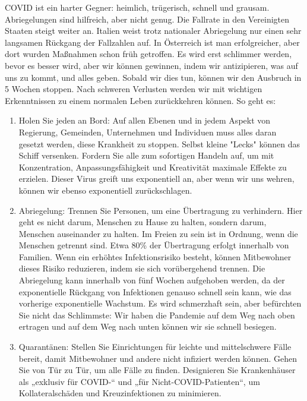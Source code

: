 \documentclass[onecolumn,journal]{IEEEtran}
\begin{document}
\begin{multicols}{2}
COVID ist ein harter Gegner: heimlich, trügerisch, schnell und grausam. Abriegelungen sind hilfreich, aber nicht genug. Die Fallrate in den Vereinigten Staaten steigt weiter an. Italien weist trotz nationaler Abriegelung nur einen sehr langsamen Rückgang der Fallzahlen auf. In Österreich ist man erfolgreicher, aber dort wurden Maßnahmen schon früh getroffen. Es wird erst schlimmer werden, bevor es besser wird, aber wir können gewinnen, indem wir antizipieren, was auf uns zu kommt, und alles geben. Sobald wir dies tun, können wir den Ausbruch in 5 Wochen stoppen. Nach schweren Verlusten werden wir mit wichtigen Erkenntnissen zu einem normalen Leben zurückkehren können. So geht es:

\begin{enumerate}
\item Holen Sie jeden an Bord: Auf allen Ebenen und in jedem Aspekt von Regierung, Gemeinden, Unternehmen und Individuen muss alles daran gesetzt werden, diese Krankheit zu stoppen. Selbst kleine "Lecks" können das Schiff versenken. Fordern Sie alle zum sofortigen Handeln auf, um mit Konzentration, Anpassungsfähigkeit und Kreativität maximale Effekte zu erzielen. Dieser Virus greift uns exponentiell an, aber wenn wir uns wehren, können wir ebenso exponentiell zurückschlagen.
\item Abriegelung: Trennen Sie Personen, um eine Übertragung zu verhindern. Hier geht es nicht darum, Menschen zu Hause zu halten, sondern darum, Menschen auseinander zu halten. Im Freien zu sein ist in Ordnung, wenn die Menschen getrennt sind. Etwa 80\% der Übertragung erfolgt innerhalb von Familien. Wenn ein erhöhtes Infektionsrisiko besteht, können Mitbewohner dieses Risiko reduzieren, indem sie sich vorübergehend trennen. Die Abriegelung kann innerhalb von fünf Wochen aufgehoben werden, da der exponentielle Rückgang von Infektionen genauso schnell sein kann, wie das vorherige exponentielle Wachstum. Es wird schmerzhaft sein, aber befürchten Sie nicht das Schlimmste: Wir haben die Pandemie auf dem Weg nach oben ertragen und auf dem Weg nach unten können wir sie schnell besiegen. %
\item Quarantänen: Stellen Sie Einrichtungen für leichte und mittelschwere Fälle bereit, damit Mitbewohner und andere nicht infiziert werden können. Gehen Sie von Tür zu Tür, um alle Fälle zu finden. Designieren Sie Krankenhäuser als „exklusiv für COVID-“ und „für Nicht-COVID-Patienten“, um Kollateralschäden und Kreuzinfektionen zu minimieren.

\end{enumerate}
\end{multicols}
\end{document}
